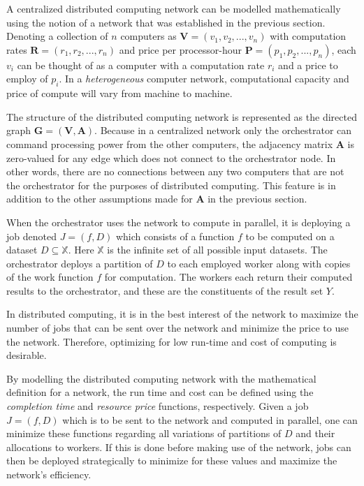 \documentclass[../mthe-493-project-proposal.tex]{subfiles}
\begin{document}
    A centralized distributed computing network can be modelled mathematically using the notion of a network that was established in the previous section. Denoting a collection of $n$ computers as $\mathbf{V} = (v_1, v_2, ..., v_n)$ with computation rates $\mathbf{R} = (r_1, r_2, ..., r_n)$ and price per processor-hour $\mathbf{P} = (p_1, p_2, ..., p_n)$, each $v_i$ can be thought of as a computer with a computation rate $r_i$ and a price to employ of $p_i$. In a \textit{heterogeneous} computer network, computational capacity and price of compute will vary from machine to machine.

    The structure of the distributed computing network is represented as the directed graph $\mathbf{G} = (\mathbf{V}, \mathbf{A})$. Because in a centralized network only the orchestrator can command processing power from the other computers, the adjacency matrix $\mathbf{A}$ is zero-valued for any edge which does not connect to the orchestrator node. In other words, there are no connections between any two computers that are not the orchestrator for the purposes of distributed computing. This feature is in addition to the other assumptions made for $\mathbf{A}$ in the previous section.

    When the orchestrator uses the network to compute in parallel, it is deploying a job denoted $J = (f,D)$ which consists of a function $f$ to be computed on a dataset $D \subseteq \mathbb{X}$. Here $\mathbb{X}$ is the infinite set of all possible input datasets. The orchestrator deploys a partition of $D$ to each employed worker along with copies of the work function $f$ for computation. The workers each return their computed results to the orchestrator, and these are the constituents of the result set $Y$.

    In distributed computing, it is in the best interest of the network to maximize the number of jobs that can be sent over the network and minimize the price to use the network. Therefore, optimizing for low run-time and cost of computing is desirable.

    By modelling the distributed computing network with the mathematical definition for a network, the run time and cost can be defined using the \textit{completion time} and \textit{resource price} functions, respectively. Given a job $J = (f,D)$ which is to be sent to the network and computed in parallel, one can minimize these functions regarding all variations of partitions of $D$ and their allocations to workers. If this is done before making use of the network, jobs can then be deployed strategically to minimize for these values and maximize the network's efficiency.
\end{document}
